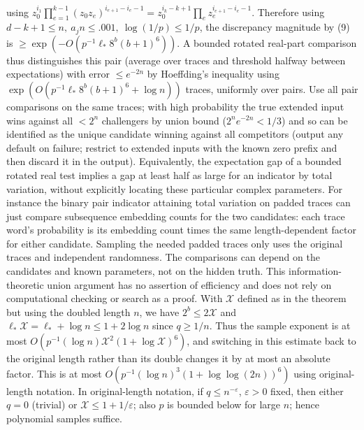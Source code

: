 \documentclass[11pt]{article}
\begin{document}
using \(z_0^{i_1}\prod_{e=1}^{k-1}(z_0 z_e)^{i_{e+1}-i_e-1}=z_0^{i_k-k+1}\prod_e z_e^{i_{e+1}-i_e-1}\). Therefore using \(d-k+1\le n,\ a_j n\le.001,\ \log(1/p)\le1/p\), the discrepancy magnitude by (9) is \(\ge\exp(-O(p^{-1}\ell_*8^b(b+1)^6))\). A bounded rotated real-part comparison thus distinguishes this pair (average over traces and threshold halfway between expectations) with error \(\le e^{-2n}\) by Hoeffding's inequality \cite{Hoeffding} using \(\exp(O(p^{-1}\ell_*8^b(b+1)^6+\log n))\) traces, uniformly over pairs. Use all pair comparisons on the same traces; with high probability the true extended input wins against all \(<2^n\) challengers by union bound ($2^n e^{-2n}<1/3$) and so can be identified as the unique candidate winning against all competitors (output any default on failure; restrict to extended inputs with the known zero prefix and then discard it in the output). Equivalently, the expectation gap of a bounded rotated real test implies a gap at least half as large for an indicator by total variation, without explicitly locating these particular complex parameters. For instance the binary pair indicator attaining total variation on padded traces can just compare subsequence embedding counts for the two candidates: each trace word's probability is its embedding count times the same length-dependent factor for either candidate. Sampling the needed padded traces only uses the original traces and independent randomness. The comparisons can depend on the candidates and known parameters, not on the hidden truth. This information-theoretic union argument has no assertion of efficiency and does not rely on computational checking or search as a proof. With \(\mathcal X\) defined as in the theorem but using the doubled length \(n\),
we have \(2^b\le2\mathcal X\) and \(\ell_*\mathcal X=\ell_*+\log n\le1+2\log n\)
since \(q\ge1/n\). Thus the sample exponent is at most
\(O(p^{-1}(\log n)\mathcal X^2(1+\log \mathcal X)^6)\), and switching in
this estimate back to the original length rather than its double changes it
by at most an absolute factor. This is at most
\(O(p^{-1}(\log n)^3(1+\log\log(2n))^6)\) using original-length notation.
In original-length notation, if \(q\le n^{-\varepsilon}\), \(\varepsilon>0\) fixed, then either \(q=0\)
(trivial) or \(\mathcal X\le1+1/\varepsilon\);
also \(p\) is bounded below for large \(n\); hence polynomial samples suffice.
\end{document}
